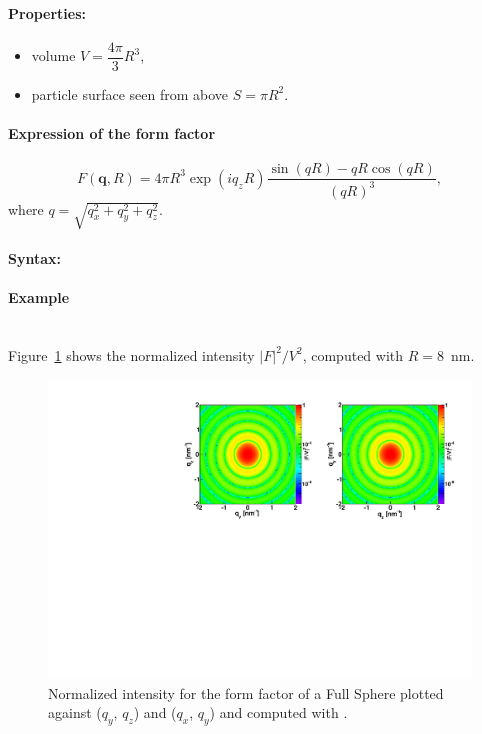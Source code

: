 \paragraph{Properties:}
\begin{itemize}
\item volume $V = \dfrac{4\pi}{3}R^3$,
\item particle surface seen from above $S= \pi R^2$.
\end{itemize}

\paragraph{Expression of the form factor}
\begin{equation*}
F(\mathbf{q},R) = 4\pi R^3 \exp(iq_z R)\frac{\sin(q R) - q R \cos(q R)}{(qR)^3},
\end{equation*}
where $q=\sqrt{q_x^2 + q_y^2 + q_z^2}$.

\paragraph{Syntax:} 

\newpage

\paragraph{Example}\mbox{}\\
Figure~\ref{fig:FFfSphereEx} shows the normalized intensity $|F|^2/V^2$, computed with $R=8$~nm.
\begin{figure}[ht]
\begin{center}
\includegraphics[angle=-90,width=\textwidth]{Figures/ff/figfffsphere.pdf}
\end{center}
\caption{Normalized intensity for the
  form factor of a Full Sphere plotted against ($q_y$, $q_z$) and ($q_x$, $q_y$) and computed with .}
\label{fig:FFfSphereEx}
\end{figure}

